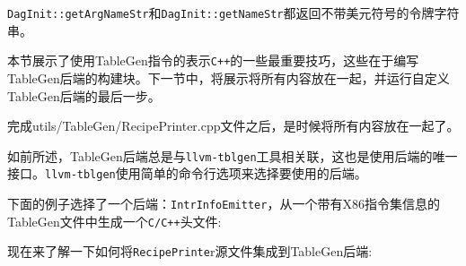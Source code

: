\begin{tcolorbox}[colback=blue!5!white,colframe=blue!75!black, fonttitle=\bfseries,title=Note]
\hspace*{0.7cm}\texttt{DagInit::getArgNameStr}和\texttt{DagInit::getNameStr}都返回不带美元符号的令牌字符串。
\end{tcolorbox}

本节展示了使用TableGen指令的表示\texttt{C++}的一些最重要技巧，这些在于编写TableGen后端的构建块。下一节中，将展示将所有内容放在一起，并运行自定义TableGen后端的最后一步。


完成utils/TableGen/RecipePrinter.cpp文件之后，是时候将所有内容放在一起了。

如前所述，TableGen后端总是与\texttt{llvm-tblgen}工具相关联，这也是使用后端的唯一接口。\texttt{llvm-tblgen}使用简单的命令行选项来选择要使用的后端。

下面的例子选择了一个后端：\texttt{IntrInfoEmitter}，从一个带有X86指令集信息的TableGen文件中生成一个\texttt{C/C++}头文件:


现在来了解一下如何将\texttt{RecipePrinte}r源文件集成到TableGen后端:

